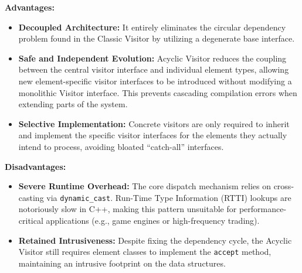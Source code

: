 \textbf{Advantages:}
\begin{itemize}
    \item \textbf{Decoupled Architecture:} It entirely eliminates the circular dependency problem found in the Classic Visitor by utilizing a degenerate base interface.
    \item \textbf{Safe and Independent Evolution:} Acyclic Visitor reduces the coupling between the central visitor interface and individual element types, allowing new element-specific visitor interfaces to be introduced without modifying a monolithic Visitor interface. This prevents cascading compilation errors when extending parts of the system.
    \item \textbf{Selective Implementation:} Concrete visitors are only required to inherit and implement the specific visitor interfaces for the elements they actually intend to process, avoiding bloated ``catch-all'' interfaces.
\end{itemize}

\textbf{Disadvantages:}
\begin{itemize}
    \item \textbf{Severe Runtime Overhead:} The core dispatch mechanism relies on cross-casting via \texttt{dynamic\_cast}. Run-Time Type Information (RTTI) lookups are notoriously slow in C++, making this pattern unsuitable for performance-critical applications (e.g., game engines or high-frequency trading).
    \item \textbf{Retained Intrusiveness:} Despite fixing the dependency cycle, the Acyclic Visitor still requires element classes to implement the \texttt{accept} method, maintaining an intrusive footprint on the data structures.
\end{itemize}